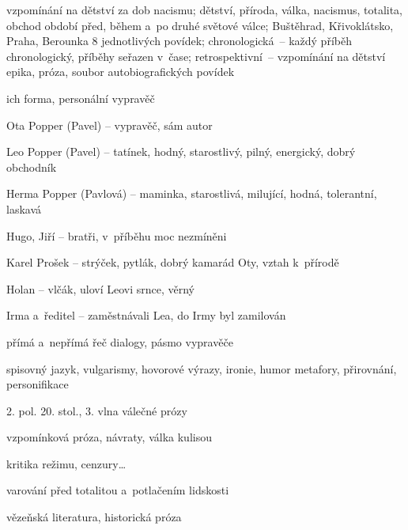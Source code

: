 {
vzpomínání na dětství za dob nacismu; dětství, příroda, válka, nacismus, totalita, obchod
období před, během a~po druhé světové válce; Buštěhrad, Křivoklátsko, Praha, Berounka
8 jednotlivých povídek; chronologická~-- každý příběh chronologický, příběhy
seřazen v~čase; retrospektivní~-- vzpomínání na dětství
epika, próza, soubor autobiografických povídek

\newpart

ich forma, personální vypravěč
\begin{compactdesc}
\item[Ota Popper (Pavel)] – vypravěč, sám autor
\item[Leo Popper (Pavel)] – tatínek, hodný, starostlivý, pilný, energický, dobrý obchodník
\item[Herma Popper (Pavlová)] – maminka, starostlivá, milující, hodná, tolerantní, laskavá
\item[Hugo, Jiří] – bratři, v~příběhu moc nezmíněni
\item[Karel Prošek] – strýček, pytlák, dobrý kamarád Oty, vztah k~přírodě
\item[Holan] – vlčák, uloví Leovi srnce, věrný
\item[Irma a~ředitel] – zaměstnávali Lea, do Irmy byl zamilován 
\end{compactdesc}

přímá a~nepřímá řeč
dialogy, pásmo vypravěče

\newpart

spisovný jazyk, vulgarismy, hovorové výrazy, ironie, humor
metafory, přirovnání, personifikace

\begin{compactitem}
	\item 2. pol. 20. stol., 3. vlna válečné prózy
	\item vzpomínková próza, návraty, válka kulisou
	\item kritika režimu, cenzury\dots
	\item varování před totalitou a~potlačením lidskosti
	\item vězeňská literatura, historická próza
\end{compactitem}

}
